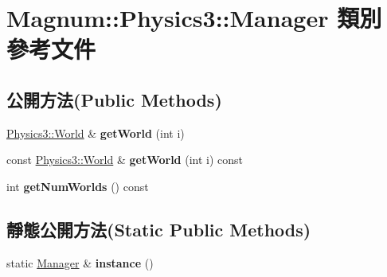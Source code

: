 \hypertarget{class_magnum_1_1_physics3_1_1_manager}{}\section{Magnum\+:\+:Physics3\+:\+:Manager 類別 參考文件}
\label{class_magnum_1_1_physics3_1_1_manager}
\subsection*{公開方法(Public Methods)}
\begin{DoxyCompactItemize}
\item 
\hyperlink{class_magnum_1_1_physics3_1_1_world}{Physics3\+::\+World} \& {\bfseries get\+World} (int i)\hypertarget{class_magnum_1_1_physics3_1_1_manager_a3b08aae390dd5f4131c6414e79cd45ee}{}\label{class_magnum_1_1_physics3_1_1_manager_a3b08aae390dd5f4131c6414e79cd45ee}

\item 
const \hyperlink{class_magnum_1_1_physics3_1_1_world}{Physics3\+::\+World} \& {\bfseries get\+World} (int i) const \hypertarget{class_magnum_1_1_physics3_1_1_manager_ac88e65302cdac2ae5d81c5ca5aeb92d4}{}\label{class_magnum_1_1_physics3_1_1_manager_ac88e65302cdac2ae5d81c5ca5aeb92d4}

\item 
int {\bfseries get\+Num\+Worlds} () const \hypertarget{class_magnum_1_1_physics3_1_1_manager_a85a5ffb3d5f918edf4c56b7b089ecb43}{}\label{class_magnum_1_1_physics3_1_1_manager_a85a5ffb3d5f918edf4c56b7b089ecb43}

\end{DoxyCompactItemize}
\subsection*{靜態公開方法(Static Public Methods)}
\begin{DoxyCompactItemize}
\item 
static \hyperlink{class_magnum_1_1_physics3_1_1_manager}{Manager} \& {\bfseries instance} ()\hypertarget{class_magnum_1_1_physics3_1_1_manager_a149d75e3a7eae7e1714549e43aac9a52}{}\label{class_magnum_1_1_physics3_1_1_manager_a149d75e3a7eae7e1714549e43aac9a52}

\end{DoxyCompactItemize}
